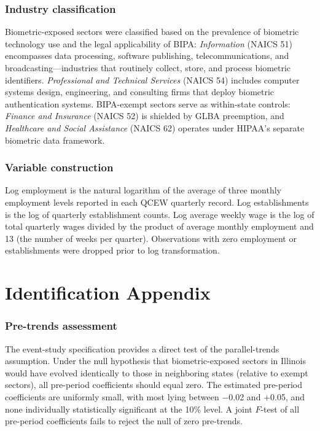 \documentclass[12pt]{article}
\begin{document}
\subsubsection*{Industry classification} Biometric-exposed sectors were classified based on the prevalence of biometric technology use and the legal applicability of BIPA: \emph{Information} (NAICS 51) encompasses data processing, software publishing, telecommunications, and broadcasting---industries that routinely collect, store, and process biometric identifiers. \emph{Professional and Technical Services} (NAICS 54) includes computer systems design, engineering, and consulting firms that deploy biometric authentication systems. BIPA-exempt sectors serve as within-state controls: \emph{Finance and Insurance} (NAICS 52) is shielded by GLBA preemption, and \emph{Healthcare and Social Assistance} (NAICS 62) operates under HIPAA's separate biometric data framework.

\subsubsection*{Variable construction} Log employment is the natural logarithm of the average of three monthly employment levels reported in each QCEW quarterly record. Log establishments is the log of quarterly establishment counts. Log average weekly wage is the log of total quarterly wages divided by the product of average monthly employment and 13 (the number of weeks per quarter). Observations with zero employment or establishments were dropped prior to log transformation.


\section{Identification Appendix}
\label{app:identification}

\subsubsection*{Pre-trends assessment} The event-study specification provides a direct test of the parallel-trends assumption. Under the null hypothesis that biometric-exposed sectors in Illinois would have evolved identically to those in neighboring states (relative to exempt sectors), all pre-period coefficients should equal zero. The estimated pre-period coefficients are uniformly small, with most lying between $-$0.02 and $+$0.05, and none individually statistically significant at the 10\% level. A joint $F$-test of all pre-period coefficients fails to reject the null of zero pre-trends.
\end{document}
